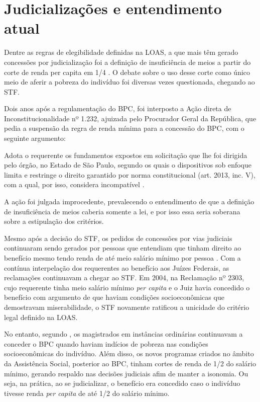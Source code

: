 \documentclass[
	12pt,				%
	openright,			%
	twoside,			%
	a4paper,			%
	english,			%
	french,				%
	spanish,			%
	brazil				%
	]{abntex2}
\begin{document}
\section{Judicializações e entendimento atual}

Dentre as regras de elegibilidade definidas na LOAS, a que mais têm  gerado concessões por judicialização foi a definição de insuficiência de meios a partir do corte de renda per capita em 1/4 \cite{adriana2016}. O debate sobre o uso desse corte como único meio de aferir a pobreza do indivíduo foi diversas vezes questionada, chegando ao STF. 

Dois anos após a regulamentação do BPC, foi interposto a Ação direta de Inconstitucionalidade nº 1.232, ajuizada pelo Procurador Geral da República, que pedia a suspensão da regra de renda mínima para a concessão do BPC, com o seguinte argumento:

	\begin{citacao}
	Adota o requerente os fundamentos expostos em solicitação que lhe foi dirigida pelo órgão, no Estado de São Paulo, segundo os quais o dispositivos sob enfoque limita e restringe o direito garantido por norma constitucional (art. 2013, inc. V), com a qual, por isso, considera incompatível \cite[pag. 96 ]{acao1232}.
\end{citacao}

A ação foi julgada improcedente, prevalecendo o entendimento de que a definição de insuficiência de meios caberia somente a lei, e por isso essa seria soberana sobre a estipulação dos critérios. 

Mesmo após a decisão do STF, os pedidos de concessões por vias judiciais continuaram sendo gerados por pessoas que entendiam que tinham direito ao benefício mesmo tendo renda de até meio salário mínimo por pessoa \cite{bpcstf}. Com a contínua interpelação dos requerentes ao benefício aos Juízes Federais, as reclamações continuavam a chegar ao STF. Em 2004, na Reclamação nº 2303, cujo requerente tinha meio salário mínimo \textit{per capita} e o Juiz havia concedido o benefício com argumento de que haviam condições socioeconômicas que demostravam miserabilidade, o STF novamente ratificou a unicidade do critério legal definido na LOAS. 

No entanto, segundo \cite{bpcstf}, os magistrados em instâncias ordinárias continuavam a conceder o BPC quando haviam indícios de pobreza nas condições socioeconômicas do indivíduo. Além disso, os novos programas criados no âmbito da Assistência Social, posterior ao BPC, tinham cortes de renda de 1/2 do salário mínimo, gerando respaldo nas decisões judiciais afim de manter a isonomia. Ou seja, na prática, ao se judicializar, o benefício era concedido caso o indivíduo tivesse renda \textit{per capita} de até 1/2 do salário mínimo. 
\end{document}
